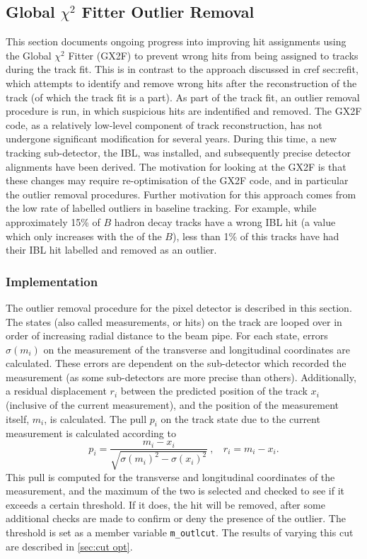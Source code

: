 \subsection{Global \texorpdfstring{$\chi^2$}{chi2} Fitter Outlier Removal}\label{sec:gx2f outlier removal}

This section documents ongoing progress into improving hit assignments using the Global $\chi^2$ Fitter (GX2F) to prevent wrong hits from being assigned to tracks during the track fit. This is in contrast to the approach discussed in  cref sec:refit, which attempts to identify and remove wrong hits after the reconstruction of the track (of which the track fit is a part). As part of the track fit, an outlier removal procedure is run, in which suspicious hits are indentified and removed. The GX2F code, as a relatively low-level component of track reconstruction, has not undergone significant modification for several years. During this time, a new tracking sub-detector, the IBL, was installed, and subsequently precise detector alignments have been derived. The motivation for looking at the GX2F is that these changes may require re-optimisation of the GX2F code, and in particular the outlier removal procedures. Further motivation for this approach comes from the low rate of labelled outliers in baseline tracking. For example, while approximately 15\% of $B$ hadron decay tracks have a wrong IBL hit (a value which only increases with the \pT of the $B$), less than 1\% of this tracks have had their IBL hit labelled and removed as an outlier.

\subsubsection{Implementation}
The outlier removal procedure for the pixel detector is described in this section. The states (also called measurements, or hits) on the track are looped over in order of increasing radial distance to the beam pipe. For each state, errors $\sigma(m_i)$ on the measurement of the transverse and longitudinal coordinates are calculated. These errors are dependent on the sub-detector which recorded the measurement (as some sub-detectors are more precise than others). Additionally, a residual displacement $r_i$ between the predicted position of the track $x_i$ (inclusive of the current measurement), and the position of the measurement itself, $m_i$, is calculated. The pull $p_i$ on the track state due to the current measurement is calculated according to
%
\begin{equation}
    p_i = \frac{m_i - x_i}{\sqrt{\sigma(m_i)^2 - \sigma(x_i)^2}}
    ~,~~~~ 
    r_i = m_i - x_i  .
\end{equation}
%
This pull is computed for the transverse and longitudinal coordinates of the measurement, and the maximum of the two is selected and checked to see if it exceeds a certain threshold. If it does, the hit will be removed, after some additional checks are made to confirm or deny the presence of the outlier. The threshold is set as a member variable \texttt{m\_outlcut}. The results of varying this cut are described in \cref{sec:cut opt}.


